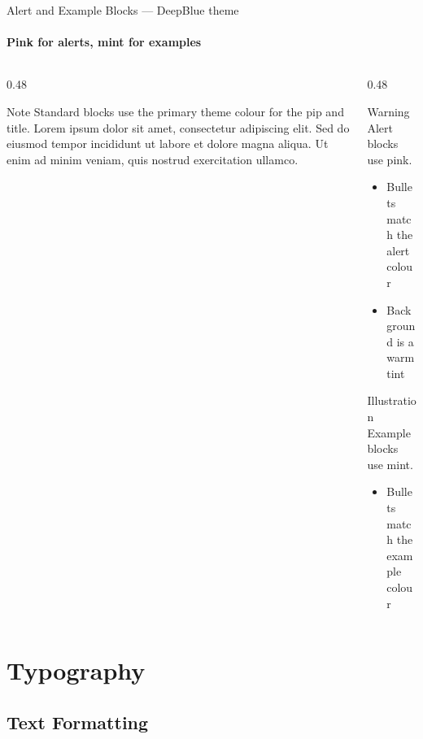 \documentclass[aspectratio=169]{beamer}
\begin{document}
{
\begin{frame}{Alert and Example Blocks — DeepBlue theme}
  \framesubtitle{Pink for alerts, mint for examples}
  \begin{columns}[T]
    \begin{column}{0.48\textwidth}
      \begin{block}{Note}
        Standard blocks use the primary theme colour for the pip
        and title. Lorem ipsum dolor sit amet, consectetur
        adipiscing elit. Sed do eiusmod tempor incididunt ut
        labore et dolore magna aliqua. Ut enim ad minim veniam,
        quis nostrud exercitation ullamco.
      \end{block}
    \end{column}
    \begin{column}{0.48\textwidth}
      \begin{alertblock}{Warning}
        Alert blocks use pink.
        \begin{itemize}
          \item Bullets match the alert colour
          \item Background is a warm tint
        \end{itemize}
      \end{alertblock}
      \begin{exampleblock}{Illustration}
        Example blocks use mint.
        \begin{itemize}
          \item Bullets match the example colour
        \end{itemize}
      \end{exampleblock}
    \end{column}
  \end{columns}
\end{frame}
}

\section{Typography}

\subsection{Text Formatting}
\end{document}
